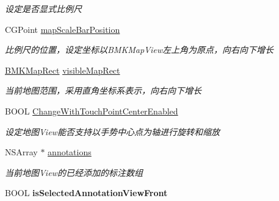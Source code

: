 \begin{DoxyCompactItemize}
\begin{DoxyCompactList}\small\item\em 设定是否显式比例尺 \end{DoxyCompactList}\item 
\hypertarget{interface_b_m_k_map_view_a5eeee2f88682636f7e6f891246b03730}{}C\+G\+Point \hyperlink{interface_b_m_k_map_view_a5eeee2f88682636f7e6f891246b03730}{map\+Scale\+Bar\+Position}\label{interface_b_m_k_map_view_a5eeee2f88682636f7e6f891246b03730}

\begin{DoxyCompactList}\small\item\em 比例尺的位置，设定坐标以\+B\+M\+K\+Map\+View左上角为原点，向右向下增长 \end{DoxyCompactList}\item 
\hypertarget{interface_b_m_k_map_view_a35576ab39592ef50d1190c2b672c0923}{}\hyperlink{struct_b_m_k_map_rect}{B\+M\+K\+Map\+Rect} \hyperlink{interface_b_m_k_map_view_a35576ab39592ef50d1190c2b672c0923}{visible\+Map\+Rect}\label{interface_b_m_k_map_view_a35576ab39592ef50d1190c2b672c0923}

\begin{DoxyCompactList}\small\item\em 当前地图范围，采用直角坐标系表示，向右向下增长 \end{DoxyCompactList}\item 
\hypertarget{interface_b_m_k_map_view_aa1868ea167edc68fe4b15ad982968ade}{}B\+O\+O\+L \hyperlink{interface_b_m_k_map_view_aa1868ea167edc68fe4b15ad982968ade}{Change\+With\+Touch\+Point\+Center\+Enabled}\label{interface_b_m_k_map_view_aa1868ea167edc68fe4b15ad982968ade}

\begin{DoxyCompactList}\small\item\em 设定地图\+View能否支持以手势中心点为轴进行旋转和缩放 \end{DoxyCompactList}\item 
\hypertarget{interface_b_m_k_map_view_a61bc5de820abcf06bf3792c933f3e618}{}N\+S\+Array $\ast$ \hyperlink{interface_b_m_k_map_view_a61bc5de820abcf06bf3792c933f3e618}{annotations}\label{interface_b_m_k_map_view_a61bc5de820abcf06bf3792c933f3e618}

\begin{DoxyCompactList}\small\item\em 当前地图\+View的已经添加的标注数组 \end{DoxyCompactList}\item 
\hypertarget{interface_b_m_k_map_view_a5907ada55d984353e2af6c510a334810}{}B\+O\+O\+L {\bfseries is\+Selected\+Annotation\+View\+Front}\label{interface_b_m_k_map_view_a5907ada55d984353e2af6c510a334810}


\end{DoxyCompactItemize}
